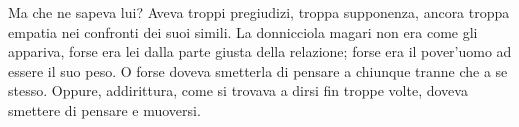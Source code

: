 Ma che ne sapeva lui? Aveva troppi pregiudizi, troppa supponenza, ancora troppa empatia nei confronti dei suoi simili. La donnicciola magari non era come gli appariva, forse era lei dalla parte giusta della relazione; forse era il pover'uomo ad essere il suo peso. O forse doveva smetterla di pensare a chiunque tranne che a se stesso. Oppure, addirittura, come si trovava a dirsi fin troppe volte, doveva smettere di pensare e muoversi.

